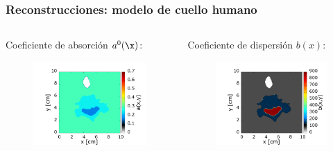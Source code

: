 \begin{frame}
\frametitle{Reconstrucciones: modelo de cuello humano}

\centering
\begin{columns}[t]  
  
\begin{column}{0.5\textwidth}
Coeficiente de absorción $a^0(\x)$:
\begin{figure} 
  \includegraphics[width=1.0\textwidth]{figuras/neck_i.png}
\end{figure}   
\end{column} 

\begin{column}{0.5\textwidth}
Coeficiente de dispersión $b(x)$:
\begin{figure}
  \includegraphics[width=1.0\textwidth]{figuras/neckmss_scatt.png}
\end{figure} 
\end{column} 

\end{columns} 

\end{frame}

